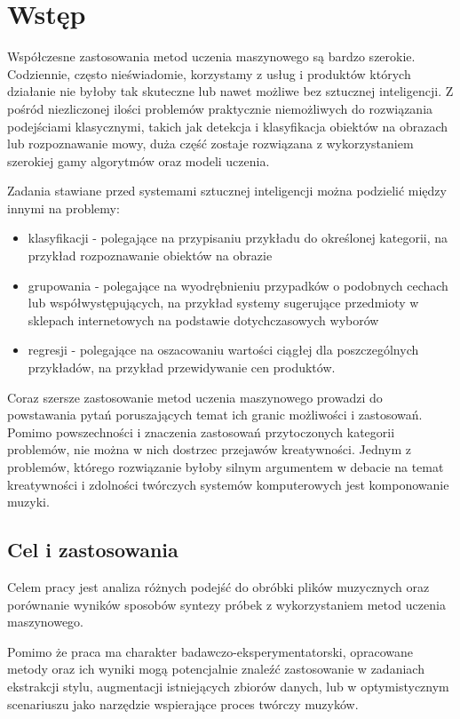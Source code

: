 
\chapter{Wstęp}
{
    Współczesne zastosowania metod uczenia maszynowego są bardzo szerokie. Codziennie, często nieświadomie,
    korzystamy z usług i produktów których działanie nie byłoby tak skuteczne lub nawet możliwe bez sztucznej inteligencji.
    Z pośród niezliczonej ilości problemów praktycznie niemożliwych do rozwiązania podejściami klasycznymi, 
    takich jak detekcja i klasyfikacja obiektów na obrazach lub rozpoznawanie mowy,
    duża część zostaje rozwiązana z wykorzystaniem szerokiej gamy algorytmów oraz modeli uczenia.

    Zadania stawiane przed systemami sztucznej inteligencji można podzielić między innymi na problemy:
    \begin{itemize}
        \item klasyfikacji - polegające na przypisaniu przykładu do określonej kategorii, 
        na przykład rozpoznawanie obiektów na obrazie 
        \item grupowania - polegające na wyodrębnieniu przypadków o podobnych cechach 
        lub współwystępujących, na przykład systemy sugerujące przedmioty w sklepach internetowych na podstawie dotychczasowych wyborów
        \item regresji - polegające na oszacowaniu wartości ciągłej dla poszczególnych przykładów, 
        na przykład przewidywanie cen produktów.
    \end{itemize}

    Coraz szersze zastosowanie metod uczenia maszynowego prowadzi do powstawania pytań poruszających temat 
    ich granic możliwości i zastosowań.
    Pomimo powszechności i znaczenia zastosowań przytoczonych kategorii problemów, nie można w nich dostrzec przejawów kreatywności.
    Jednym z problemów, którego rozwiązanie byłoby silnym argumentem w debacie na temat kreatywności i zdolności twórczych
    systemów komputerowych jest komponowanie muzyki.

    \section{Cel i zastosowania}
    {
        Celem pracy jest analiza różnych podejść do obróbki plików muzycznych oraz 
        porównanie wyników sposobów syntezy próbek z wykorzystaniem metod uczenia maszynowego. 

        Pomimo że praca ma charakter badawczo-eksperymentatorski, 
        opracowane metody oraz ich wyniki mogą potencjalnie znaleźć zastosowanie
        w zadaniach ekstrakcji stylu, augmentacji istniejących zbiorów danych,
        lub w optymistycznym scenariuszu jako narzędzie wspierające proces twórczy muzyków.
    }

}
